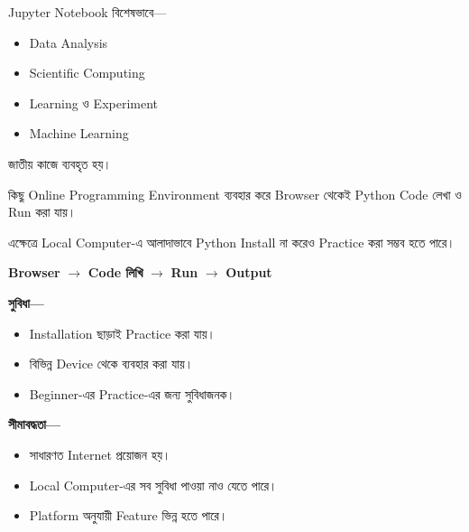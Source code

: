 Jupyter Notebook বিশেষভাবে—

\begin{itemize}

\item Data Analysis

\item Scientific Computing

\item Learning ও Experiment

\item Machine Learning

\end{itemize}

জাতীয় কাজে ব্যবহৃত হয়।



কিছু Online Programming Environment ব্যবহার করে Browser থেকেই
Python Code লেখা ও Run করা যায়।

এক্ষেত্রে Local Computer-এ আলাদাভাবে Python Install না করেও
Practice করা সম্ভব হতে পারে।

\begin{center}

\textbf{Browser}
\(\longrightarrow\)
\textbf{Code লিখি}
\(\longrightarrow\)
\textbf{Run}
\(\longrightarrow\)
\textbf{Output}

\end{center}

\textbf{সুবিধা—}

\begin{itemize}

\item Installation ছাড়াই Practice করা যায়।

\item বিভিন্ন Device থেকে ব্যবহার করা যায়।

\item Beginner-এর Practice-এর জন্য সুবিধাজনক।

\end{itemize}

\textbf{সীমাবদ্ধতা—}

\begin{itemize}

\item সাধারণত Internet প্রয়োজন হয়।

\item Local Computer-এর সব সুবিধা পাওয়া নাও যেতে পারে।

\item Platform অনুযায়ী Feature ভিন্ন হতে পারে।

\end{itemize}

